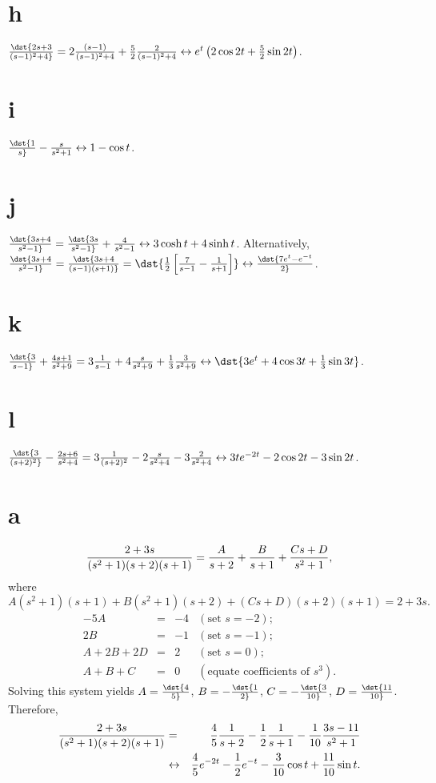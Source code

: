 \documentclass[dvips]{book}
\renewcommand{\exer}[1]{\par\medskip\;\noindent{\color{red}\bf #1.}}
\numberwithin{example}{section}
\numberwithin{equation}{section}
\numberwithin{theorem}{section}
\numberwithin{table}{section}
\numberwithin{figure}{section}
\begin{document}
\part{h}  $\dst{2s+3\over(s-1)^2+4}=2{(s-1)\over(s-1)^2+4}
+{5\over2}{2\over(s-1)^2+4}\leftrightarrow
{e^t\left(2\cos 2t+{5\over2}\sin 2t\right)}$.

\part{i} $\dst{1\over s}-{s\over s^2+1}\leftrightarrow 1-\cos t$.

\part{j}
$\dst{3s+4\over s^2-1}=\dst{3s\over s^2-1}+{4\over s^2-1}
\leftrightarrow3\cosh t+4\sinh t$.
Alternatively,
$\dst{3s+4\over
s^2-1}=\dst{3s+4\over(s-1)(s+1)}=\dst{{1\over2}\left[{7\over
s-1}-{1\over s+1}\right]}
\leftrightarrow\dst{7e^t-e^{-t}\over2}$.

\part{k}  $\dst{3\over s-1}+{4s+1\over s^2+9}=3{1\over s-1}
+4{s\over s^2+9}+{1\over3}{3\over s^2+9}\leftrightarrow
\dst{3e^t+4\cos 3t+{1\over3}\sin 3t}$.

\part{l}  $\dst{3\over(s+2)^2}-{2s+6\over s^2+4}=
3{1\over(s+2)^2}-2{s\over s^2+4}-3{2\over s^2+4}\leftrightarrow
3te^{-2t}-2\cos 2t-3\sin 2t$.


\exer{8.2.4}
\part{a}
$$
{2+3s\over(s^2+1)(s+2)(s+1)}=
{A\over s+2}+{B\over s+1}+{Cs+D\over s^2+1},
$$
where
$$
A(s^2+1)(s+1)+
B(s^2+1)(s+2)+(Cs+D)(s+2)(s+1)=2+3s.
$$
$$
\begin{array}{rcrl}
-5A&=&-4&(\mbox{set }s=-2);\\
2B&=&-1& (\mbox{set }s=-1);\\
A+2B+2D&=&2&(\mbox{set }s=0);\\
A+B+C&=&0&(\mbox{equate coefficients of }s^3).
\end{array}
$$
Solving this system yields $A=\dst{4\over5}$, $B=-\dst{1\over2}$,
$C=-\dst{3\over10}$, $D=\dst{11\over10}$. Therefore,
\begin{eqnarray*}
{2+3s\over(s^2+1)(s+2)(s+1)}&=&
{4\over5}{1\over s+2}-{1\over2}{1\over s+1}-{1\over10}{3s-11\over
s^2+1}\\
&\leftrightarrow&
{4\over5}e^{-2t}-{1\over2}e^{-t}-{3\over10}\cos t
+{11\over10}\sin t.
\end{eqnarray*}
\end{document}
